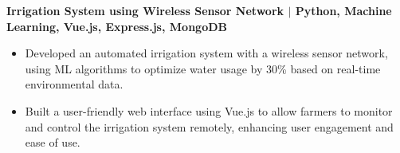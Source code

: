 \documentclass{article}
\begin{document}
\noindent \textbf{Irrigation System using Wireless Sensor Network $\mid$ {\small Python, Machine Learning, Vue.js, Express.js, MongoDB}}
\begin{itemize}[noitemsep,nolistsep,leftmargin=*]
\item {\small Developed an automated irrigation system with a wireless sensor network, using ML algorithms to optimize water usage by 30\% based on real-time environmental data.}
\item {\small Built a user-friendly web interface using Vue.js to allow farmers to monitor and control the irrigation system remotely, enhancing user engagement and ease of use.}
\end{itemize}



\end{document}
